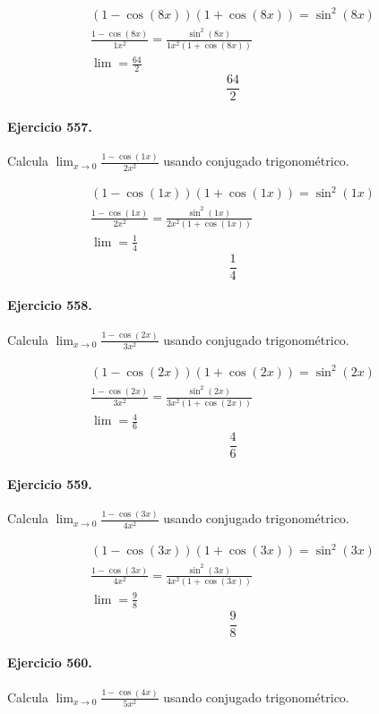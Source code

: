 \documentclass[11pt,a4paper]{article}
\begin{document}
\[
\begin{aligned}
(1-\cos(8x))(1+\cos(8x))=\sin^2(8x)\\
\frac{1-\cos(8x)}{1x^2}=\frac{\sin^2(8x)}{1x^2(1+\cos(8x))}\\
\lim=\frac{64}{2}
\end{aligned}
\]
\[\boxed{\frac{64}{2}}\]


\paragraph{Ejercicio 557.} Calcula $\displaystyle\lim_{x\to0}\frac{1-\cos(1x)}{2x^2}$ usando conjugado trigonométrico.

\[
\begin{aligned}
(1-\cos(1x))(1+\cos(1x))=\sin^2(1x)\\
\frac{1-\cos(1x)}{2x^2}=\frac{\sin^2(1x)}{2x^2(1+\cos(1x))}\\
\lim=\frac{1}{4}
\end{aligned}
\]
\[\boxed{\frac{1}{4}}\]


\paragraph{Ejercicio 558.} Calcula $\displaystyle\lim_{x\to0}\frac{1-\cos(2x)}{3x^2}$ usando conjugado trigonométrico.

\[
\begin{aligned}
(1-\cos(2x))(1+\cos(2x))=\sin^2(2x)\\
\frac{1-\cos(2x)}{3x^2}=\frac{\sin^2(2x)}{3x^2(1+\cos(2x))}\\
\lim=\frac{4}{6}
\end{aligned}
\]
\[\boxed{\frac{4}{6}}\]


\paragraph{Ejercicio 559.} Calcula $\displaystyle\lim_{x\to0}\frac{1-\cos(3x)}{4x^2}$ usando conjugado trigonométrico.

\[
\begin{aligned}
(1-\cos(3x))(1+\cos(3x))=\sin^2(3x)\\
\frac{1-\cos(3x)}{4x^2}=\frac{\sin^2(3x)}{4x^2(1+\cos(3x))}\\
\lim=\frac{9}{8}
\end{aligned}
\]
\[\boxed{\frac{9}{8}}\]


\paragraph{Ejercicio 560.} Calcula $\displaystyle\lim_{x\to0}\frac{1-\cos(4x)}{5x^2}$ usando conjugado trigonométrico.
\end{document}
